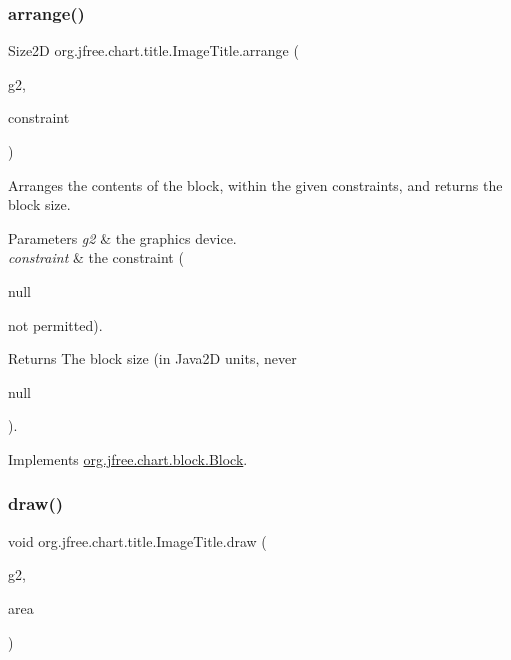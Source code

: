\subsubsection{\texorpdfstring{arrange()}{arrange()}}
{\footnotesize\ttfamily Size2D org.\+jfree.\+chart.\+title.\+Image\+Title.\+arrange (\begin{DoxyParamCaption}\item[{Graphics2D}]{g2,  }\item[{\mbox{\hyperlink{classorg_1_1jfree_1_1chart_1_1block_1_1_rectangle_constraint}{Rectangle\+Constraint}}}]{constraint }\end{DoxyParamCaption})}

Arranges the contents of the block, within the given constraints, and returns the block size.


\begin{DoxyParams}{Parameters}
{\em g2} & the graphics device. \\
\hline
{\em constraint} & the constraint (
\begin{DoxyCode}
null 
\end{DoxyCode}
 not permitted).\\
\hline
\end{DoxyParams}
\begin{DoxyReturn}{Returns}
The block size (in Java2D units, never
\begin{DoxyCode}
null 
\end{DoxyCode}
 ). 
\end{DoxyReturn}


Implements \mbox{\hyperlink{interfaceorg_1_1jfree_1_1chart_1_1block_1_1_block_ab4cabbc237c5277a4a0018bab930e5fe}{org.\+jfree.\+chart.\+block.\+Block}}.

\mbox{\label{classorg_1_1jfree_1_1chart_1_1title_1_1_image_title_a799b299251111824381f1b201d95c79d}} 
\subsubsection{\texorpdfstring{draw()}{draw()}\hspace{0.1cm}{\footnotesize\ttfamily [1/2]}}
{\footnotesize\ttfamily void org.\+jfree.\+chart.\+title.\+Image\+Title.\+draw (\begin{DoxyParamCaption}\item[{Graphics2D}]{g2,  }\item[{Rectangle2D}]{area }\end{DoxyParamCaption})}

